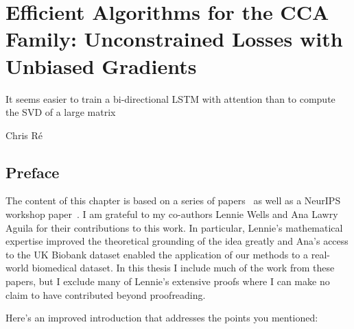 \graphicspath{{chapters/gradient_descent/}}


\chapter{Efficient Algorithms for the CCA Family: Unconstrained Losses with Unbiased Gradients}\label{ch:gradient_descent}
\epigraph{It seems easier to train a bi-directional LSTM with attention than to compute the SVD of a large matrix}{Chris Ré}\citep{gemp2021}
\minitoc
\section*{Preface}
The content of this chapter is based on a series of papers~\citep{chapman2022generalized, chapman2023efficient} as well as a NeurIPS workshop paper~\citep{chapman2023cca}.
I am grateful to my co-authors Lennie Wells and Ana Lawry Aguila for their contributions to this work.
In particular, Lennie's mathematical expertise improved the theoretical grounding of the idea greatly and Ana's access to the UK Biobank dataset enabled the application of our methods to a real-world biomedical dataset.
In this thesis I include much of the work from these papers, but I exclude many of Lennie's extensive proofs where I can make no claim to have contributed beyond proofreading.

Here's an improved introduction that addresses the points you mentioned:
